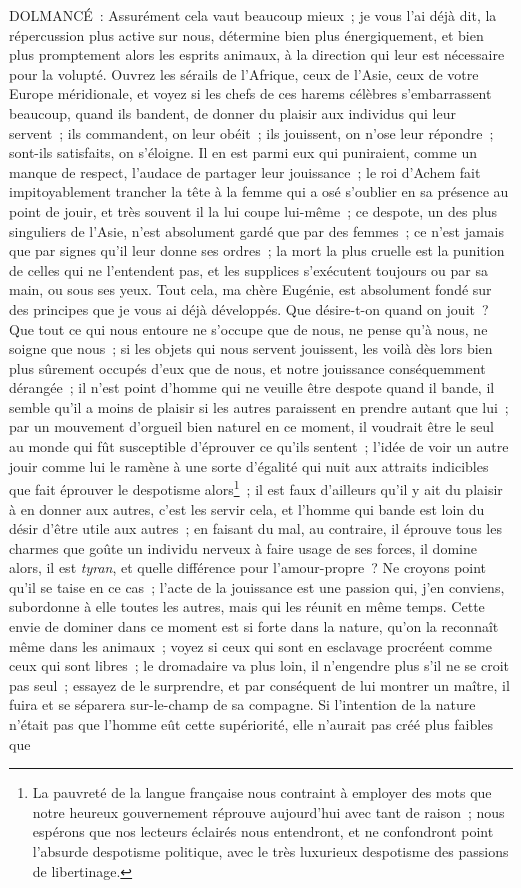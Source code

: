 \documentclass[french,twoside]{book} %
\begin{document}
DOLMANCÉ : Assurément cela vaut beaucoup mieux ; je vous l’ai déjà dit, la répercussion plus active sur nous, détermine bien plus énergiquement, et bien plus promptement alors les esprits animaux, à la direction qui leur est nécessaire pour la volupté. Ouvrez les sérails de l’Afrique, ceux de l’Asie, ceux de votre Europe méridionale, et voyez si les chefs de ces harems célèbres s’embarrassent beaucoup, quand ils bandent, de donner du plaisir aux individus qui leur servent ; ils commandent, on leur obéit ; ils jouissent, on n’ose leur répondre ; sont-ils satisfaits, on s’éloigne. Il en est parmi eux qui puniraient, comme un manque de respect, l’audace de partager leur jouissance ; le roi d’Achem fait impitoyablement trancher la tête à la femme qui a osé s’oublier en sa présence au point de jouir, et très souvent il la lui coupe lui-même ; ce despote, un des plus singuliers de l’Asie, n’est absolument gardé que par des femmes ; ce n’est jamais que par signes qu’il leur donne ses ordres ; la mort la plus cruelle est la punition de celles qui ne l’entendent pas, et les supplices s’exécutent toujours ou par sa main, ou sous ses yeux. Tout cela, ma chère Eugénie, est absolument fondé sur des principes que je vous ai déjà développés. Que désire-t-on quand on jouit ? Que tout ce qui nous entoure ne s’occupe que de nous, ne pense qu’à nous, ne soigne que nous ; si les objets qui nous servent jouissent, les voilà dès lors bien plus sûrement occupés d’eux que de nous, et notre jouissance conséquemment dérangée ; il n’est point d’homme qui ne veuille être despote quand il bande, il semble qu’il a moins de plaisir si les autres paraissent en prendre autant que lui ; par un mouvement d’orgueil bien naturel en ce moment, il voudrait être le seul au monde qui fût susceptible d’éprouver ce qu’ils sentent ; l’idée de voir un autre jouir comme lui le ramène à une sorte d’égalité qui nuit aux attraits indicibles que fait éprouver le despotisme alors\footnote{ La pauvreté de la langue française nous contraint à employer des mots que notre heureux gouvernement réprouve aujourd’hui avec tant de raison ; nous espérons que nos lecteurs éclairés nous entendront, et ne confondront point l’absurde despotisme politique, avec le très luxurieux despotisme des passions de libertinage.} ; il est faux d’ailleurs qu’il y ait du plaisir à en donner aux autres, c’est les servir cela, et l’homme qui bande est loin du désir d’être utile aux autres ; en faisant du mal, au contraire, il éprouve tous les charmes que goûte un individu nerveux à faire usage de ses forces, il domine alors, il est {\itshape tyran}, et quelle différence pour l’amour-propre ? Ne croyons point qu’il se taise en ce cas ; l’acte de la jouissance est une passion qui, j’en conviens, subordonne à elle toutes les autres, mais qui les réunit en même temps. Cette envie de dominer dans ce moment est si forte dans la nature, qu’on la reconnaît même dans les animaux ; voyez si ceux qui sont en esclavage procréent comme ceux qui sont libres ; le dromadaire va plus loin, il n’engendre plus s’il ne se croit pas seul ; essayez de le surprendre, et par conséquent de lui montrer un maître, il fuira et se séparera sur-le-champ de sa compagne. Si l’intention de la nature n’était pas que l’homme eût cette supériorité, elle n’aurait pas créé plus faibles que 
\end{document}
